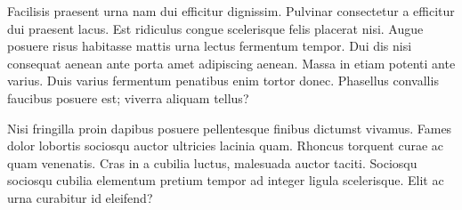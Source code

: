 \documentclass{article}
\begin{document}
Facilisis praesent urna nam dui efficitur dignissim. Pulvinar consectetur a efficitur dui praesent lacus. Est ridiculus congue scelerisque felis placerat nisi. Augue posuere risus habitasse mattis urna lectus fermentum tempor. Dui dis nisi consequat aenean ante porta amet adipiscing aenean. Massa in etiam potenti ante varius. Duis varius fermentum penatibus enim tortor donec. Phasellus convallis faucibus posuere est; viverra aliquam tellus?

Nisi fringilla proin dapibus posuere pellentesque finibus dictumst vivamus. Fames dolor lobortis sociosqu auctor ultricies lacinia quam. Rhoncus torquent curae ac quam venenatis. Cras in a cubilia luctus, malesuada auctor taciti. Sociosqu sociosqu cubilia elementum pretium tempor ad integer ligula scelerisque. Elit ac urna curabitur id eleifend?
\end{document}
